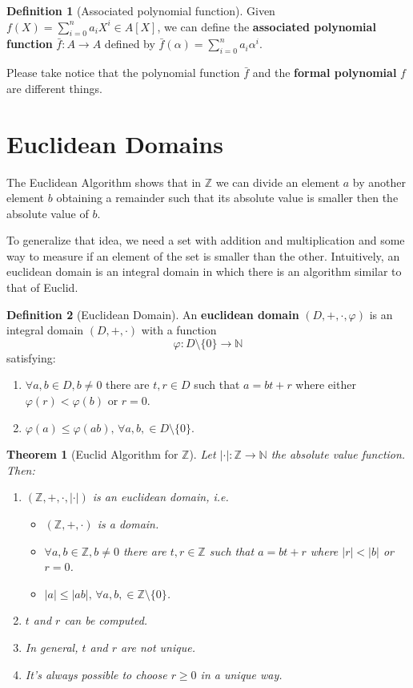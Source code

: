 \documentclass[12pt,a4paper]{article}
\newtheorem{theorem}{Theorem}[section]
\theoremstyle{definition}
\newtheorem{definition}{Definition}[section]
\begin{document}
\begin{definition}[Associated polynomial function]
Given $f(X) = \sum_{i=0}^n  a_i X^i \in A[X]$, we can define the \textbf{associated polynomial function} $\bar{f} : A \to A$ defined by $\bar{f}(\alpha) = \sum_{i=0}^n a_i \alpha^i$.
\end{definition}

Please take notice that the polynomial function $\bar{f}$ and the \textbf{formal polynomial} $f$ are different things.

\section{Euclidean Domains}

The Euclidean Algorithm shows that in $\mathbb{Z}$ we can divide an element $a$ by another element $b$ obtaining a remainder such that its absolute value is smaller then the absolute value of $b$. 

To generalize that idea, we need a set with addition and multiplication and some way to measure if an element of the set is smaller than the other. Intuitively, an euclidean domain is an integral domain in which there is an algorithm similar to that of Euclid.

\begin{definition}[Euclidean Domain]
An \textbf{euclidean domain} $(D, +, \cdot, \varphi)$ is an integral domain $(D,+,\cdot)$ with a function \[ \varphi : D \setminus \{0 \} \to \mathbb{N} \] satisfying:
\begin{enumerate}
\item $\forall a,b \in D, b \neq 0$ there are $t, r \in D$ such that $a = bt+r$ where either $\varphi(r) < \varphi(b)$ or $r = 0$.
\item $\varphi(a) \leq \varphi(ab), \, \forall a,b, \in D \setminus \{0\}$.
\end{enumerate}
\end{definition}

\begin{theorem}[Euclid Algorithm for $\mathbb{Z}$]
Let $ | \cdot | :  \mathbb{Z} \to \mathbb{N} $ the absolute value function. Then:
\begin{enumerate}
\item $(\mathbb{Z}, +, \cdot, | \cdot |)$ is an euclidean domain, i.e.
\begin{itemize}
\item $(\mathbb{Z}, +, \cdot)$ is a domain.
\item $\forall a,b \in \mathbb{Z}, b \neq 0$ there are $t, r \in \mathbb{Z}$ such that $a = bt+r$ where $|r| < |b|$ or $r = 0$.
\item $|a| \leq |ab|, \, \forall a,b, \in \mathbb{Z} \setminus \{0\}$.
\end{itemize}
\item $t$ and $r$ can be computed.
\item In general, $t$ and $r$ are not unique.
\item It's always possible to choose $r \geq 0$ in a unique way.
\end{enumerate}
\end{theorem}
\end{document}
